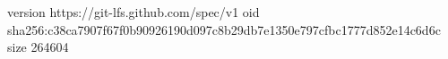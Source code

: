 version https://git-lfs.github.com/spec/v1
oid sha256:c38ca7907f67f0b90926190d097c8b29db7e1350e797cfbc1777d852e14c6d6c
size 264604
